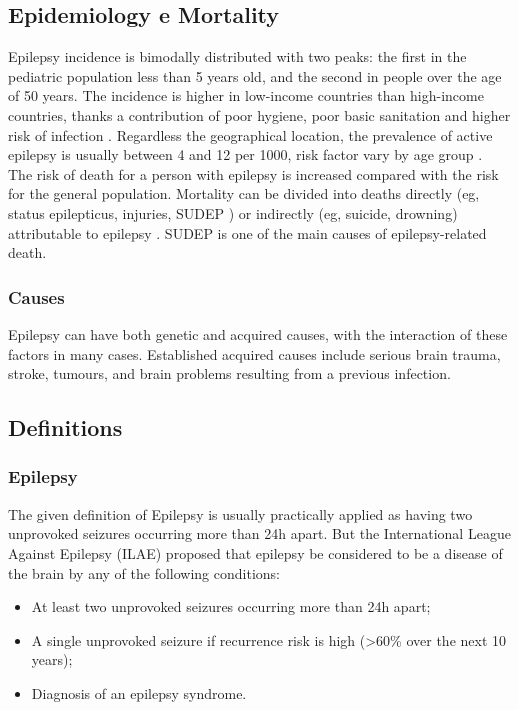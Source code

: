 \documentclass{EPL-master-thesis-covers-EN}
\begin{document}
    \subsection{Epidemiology e Mortality}
    Epilepsy incidence is bimodally distributed with two peaks: the first in the pediatric population less than 5 years old, and the second in people over the age of 50 years. The incidence is higher in low-income countries than high-income countries, thanks a contribution of poor hygiene, poor basic sanitation and higher risk of infection \cite{THIJS2019689}.
    Regardless the geographical location, the prevalence of active epilepsy is usually between 4 and 12 per 1000, risk factor vary by age group \cite{Fiest296}.\\
    The risk of death for a person with epilepsy is increased compared with the risk for the general population. Mortality can be divided into deaths directly (eg, status epilepticus, injuries, SUDEP \cite{Langan211}) or indirectly (eg, suicide, drowning) attributable to epilepsy \cite{Devinsky779}. SUDEP is one of the main causes of epilepsy-related death.
    \subsubsection*{Causes}
    Epilepsy can have both genetic and acquired causes, with the interaction of these factors in many cases. Established acquired causes include serious brain trauma, stroke, tumours, and brain problems resulting from a previous infection.

    \subsection{Definitions}
    \subsubsection*{Epilepsy}
    The given definition of Epilepsy is usually practically applied as having two unprovoked seizures occurring more than 24h apart. But the International League Against Epilepsy (ILAE) proposed that epilepsy be considered to be a disease of the brain by any of the following conditions: \cite{defEpilepsy}
    \begin{itemize}
      \item At least two unprovoked seizures occurring more than 24h apart;
      \item A single unprovoked seizure if recurrence risk is high (>60\% over the next 10 years);
      \item Diagnosis of an epilepsy syndrome.
    \end{itemize}
\end{document}
